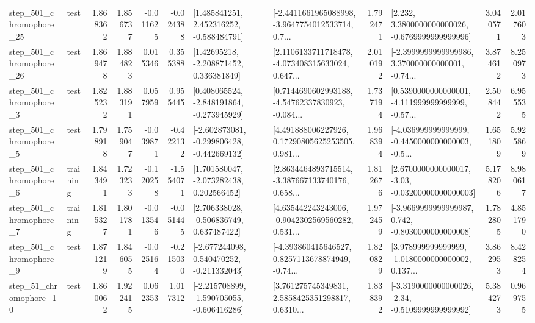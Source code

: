 \begin{tabular}{llrrrrllrlrr}
  step\_501\_chromophore\_25 &      test &      1.868362 &    1.856737 &     -0.011625 & -0.024388 &    [1.485841251, 2.452316252, -0.588484791] &  [-2.4411661965088998, -3.9647754012533714, 0.7... &       1.792471 &   [2.232, 3.3800000000000026, -0.6769999999999996] &            3.040571 &          2.017603 \\
  step\_501\_chromophore\_26 &      test &      1.869478 &    1.884823 &      0.015346 &  0.355388 &     [1.42695218, -2.208871452, 0.336381849] &  [2.1106133711718478, -4.073408315633024, 0.647... &       2.010192 &  [-2.3999999999999986, 3.370000000000001, -0.74... &            3.874612 &          8.250973 \\
   step\_501\_chromophore\_3 &      test &      1.825232 &    1.883191 &      0.057959 &  0.955445 &   [0.408065524, -2.848191864, -0.273945929] &  [0.7144690602993188, -4.54762337830923, -0.084... &       1.737194 &  [0.5390000000000001, -4.111999999999999, -0.57... &            2.508442 &          6.955535 \\
   step\_501\_chromophore\_5 &      test &      1.798918 &    1.759047 &     -0.039871 & -0.422132 &  [-2.602873081, -0.299806428, -0.442669132] &  [4.491888006227926, 0.17290805625253505, 0.981... &       1.968394 &  [-4.036999999999999, -0.4450000000000003, -0.5... &            1.651809 &          5.925869 \\
   step\_501\_chromophore\_6 &  training &      1.843491 &    1.723233 &     -0.120258 & -1.554071 &    [1.701580047, -2.073282438, 0.202566452] &  [2.8634464893715514, -3.387667133740176, 0.658... &       1.812676 &  [2.6700000000000017, -3.03, -0.03200000000000003] &            5.178206 &          8.980617 \\
   step\_501\_chromophore\_7 &  training &      1.815327 &    1.801781 &     -0.013546 & -0.051445 &    [2.706338028, -0.506836749, 0.637487422] &  [4.635442243243006, -0.9042302569560282, 0.531... &       1.972459 &  [-3.9669999999999987, 0.742, -0.8030000000000008] &            1.782805 &          4.851790 \\
   step\_501\_chromophore\_9 &      test &      1.871219 &    1.846055 &     -0.025164 & -0.215030 &   [-2.677244098, 0.540470252, -0.211332043] &  [-4.393860415646527, 0.8257113678874949, -0.74... &       1.820829 &  [3.978999999999999, -1.0180000000000002, 0.137... &            3.862953 &          8.428254 \\
   step\_51\_chromophore\_10 &      test &      1.860062 &    1.922415 &      0.062353 &  1.017312 &  [-2.215708899, -1.590705055, -0.606416286] &  [3.761275745349831, 2.5858425351298817, 0.6310... &       1.838392 &  [-3.3190000000000026, -2.34, -0.5109999999999992] &            5.384273 &          0.969755 \\

\end{tabular}
